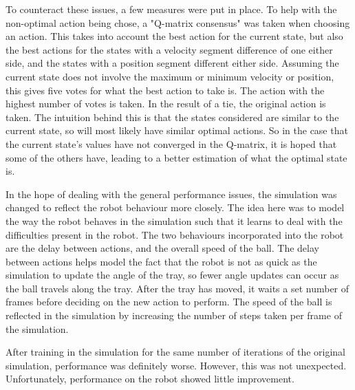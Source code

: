 \documentclass[12pt,a4paper]{article}
\begin{document}
To counteract these issues, a few measures were put in place. To help with the non-optimal action being chose, a "Q-matrix consensus" was taken when choosing an action. This takes into account the best action for the current state, but also the best actions for the states with a velocity segment difference of one either side, and the states with a position segment different either side. Assuming the current state does not involve the maximum or minimum velocity or position, this gives five votes for what the best action to take is. The action with the highest number of votes is taken. In the result of a tie, the original action is taken. The intuition behind this is that the states considered are similar to the current state, so will most likely have similar optimal actions. So in the case that the current state's values have not converged in the Q-matrix, it is hoped that some of the others have, leading to a better estimation of what the optimal state is. 

In the hope of dealing with the general performance issues, the simulation was changed to reflect the robot behaviour more closely. The idea here was to model the way the robot behaves in the simulation such that it learns to deal with the difficulties present in the robot. The two behaviours incorporated into the robot are the delay between actions, and the overall speed of the ball. The delay between actions helps model the fact that the robot is not as quick as the simulation to update the angle of the tray, so fewer angle updates can occur as the ball travels along the tray. After the tray has moved, it waits a set number of frames before deciding on the new action to perform. The speed of the ball is reflected in the simulation by increasing the number of steps taken per frame of the simulation. 

After training in the simulation for the same number of iterations of the original simulation, performance was definitely worse. However, this was not unexpected. Unfortunately, performance on the robot showed little improvement. 
\end{document}

